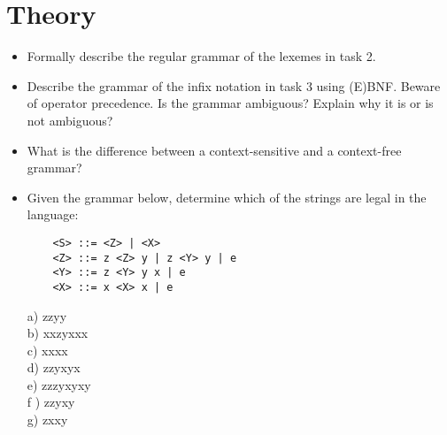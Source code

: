 \documentclass{article}
\begin{document}
\section{Theory}
\begin{itemize}
    \item Formally describe the regular grammar of the lexemes in task 2.
    \item Describe the grammar of the infix notation in task 3 using (E)BNF. Beware of operator precedence. Is
the grammar ambiguous? Explain why it is or is not ambiguous?
    \item What is the difference between a context-sensitive and a context-free grammar?
    \item Given the grammar below, determine which of the strings are legal in the language:\\
    \begin{lstlisting}
    <S> ::= <Z> | <X>
    <Z> ::= z <Z> y | z <Y> y | e
    <Y> ::= z <Y> y x | e
    <X> ::= x <X> x | e
    \end{lstlisting}
a) zzyy\\
b) xxzyxxx\\
c) xxxx\\
d) zzyxyx\\
e) zzzyxyxy\\
f ) zzyxy\\
g) zxxy\\
    
\end{itemize}
\end{document}
